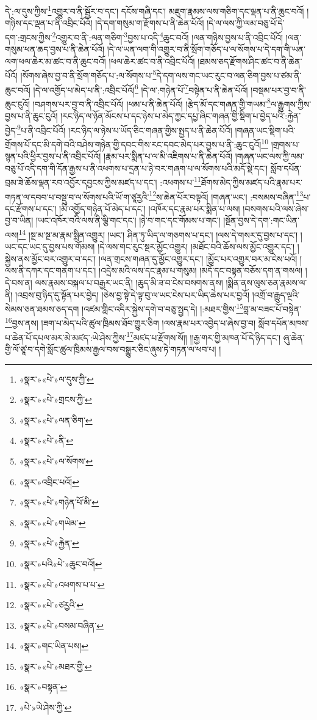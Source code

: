 དེ་:ལ་དུས་ཀྱིས་\footnote{«སྣར་»«པེ་»ལ་དུས་ཀྱི་}འགྱུར་བ་ནི་སྦྱོར་བ་དང་། དངོས་གཞི་དང་། མཇུག་རྣམས་ལས་གཅིག་དང་ལྡན་པ་ནི་ཆུང་བའོ། །གཉིས་དང་ལྡན་པ་ནི་འབྲིང་པོའོ། །དེ་དག་གསུམ་ག་རྫོགས་པ་ནི་ཆེན་པོའོ། །དེ་ལ་ལས་ཀྱི་ལམ་བཅུ་པོ་དེ་དག་:གྲངས་ཀྱིས་\footnote{«སྣར་»«པེ་»གྲངས་ཀྱི་}འགྱུར་བ་ནི་:ལན་གཅིག་\footnote{«སྣར་»«པེ་»ལན་ཅིག་}བྱས་པ་འདི་\footnote{«སྣར་»«པེ་»ནི་}ཆུང་བའོ། །ལན་གཉིས་བྱས་པ་ནི་འབྲིང་པོའོ། །ལན་གསུམ་ཕན་ཆད་བྱས་པ་ནི་ཆེན་པོའོ། །དེ་ལ་ཡན་ལག་གི་འགྱུར་བ་ནི་སྲོག་གཅོད་པ་ལ་སོགས་པ་དེ་དག་གི་ཡན་ལག་ཕལ་ཆེར་མ་ཚང་བ་ནི་ཆུང་བའོ། །ཕལ་ཆེར་ཚང་བ་ནི་འབྲིང་པོའོ། །ཐམས་ཅད་རྫོགས་ཤིང་ཚང་བ་ནི་ཆེན་པོའོ། །སོགས་ཞེས་བྱ་བ་ནི་སྲོག་གཅོད་པ་:ལ་སོགས་པ་\footnote{«སྣར་»«པེ་»ལ་སོགས་}དེ་དག་ལས་གང་ཡང་རུང་བ་ལན་ཅིག་བྱས་པ་ཙམ་ནི་ཆུང་བའོ། །དེ་ལ་འགྱོད་པ་མེད་པ་ནི་:འབྲིང་པོའོ།\footnote{«སྣར་»འབྲིང་པའོ།} །དེ་ལ་:གཉེན་པོ་\footnote{«སྣར་»«པེ་»གཉེན་པོ་མི་}བསྟེན་པ་ནི་ཆེན་པོའོ། །བསྡམ་པར་བྱ་བ་ནི་ཆུང་ངུའོ། །བཤགས་པར་བྱ་བ་ནི་འབྲིང་པོའོ། །ཕམ་པ་ནི་ཆེན་པོའོ། །རྩེད་མོ་དང་གཞན་གྱི་གཡམ་\footnote{«སྣར་»«པེ་»གཡེམ་}ལ་རྒྱུགས་ཀྱིས་བྱས་པ་ནི་ཆུང་ངུའོ། །རང་ཉིད་ལ་ཉོན་མོངས་པ་དང་ཉེས་པ་མེད་ཀྱང་དཔྱ་ཞིང་གཞན་གྱི་སྡིག་པ་བྱེད་པའི་:རྐྱེན་བྱེད་\footnote{«སྣར་»«པེ་»རྐྱེན་}པ་ནི་འབྲིང་པོའོ། །རང་ཉིད་ལ་ཉེས་པ་ཡོད་ཅིང་གཞན་གྱིས་སྤྱད་པ་ནི་ཆེན་པོའོ། །གཞན་ཡང་སྡིག་པའི་གྲོགས་པོ་དང་མི་དགེ་བའི་བཤེས་གཉེན་གྱི་དབང་གིས་རང་དབང་མེད་པར་བྱས་པ་ནི་:ཆུང་ངུའོ།\footnote{«སྣར་»པའི«པེ་»ཆུང་བའོ།} །གྲགས་པ་སྙན་པའི་ཕྱིར་བྱས་པ་ནི་འབྲིང་པོའོ། །རྣམ་པར་སྨིན་པ་ལ་མི་འཇིགས་པ་ནི་ཆེན་པོའོ། །གཞན་ཡང་ལས་ཀྱི་ལམ་བཅུ་པོ་འདི་དག་གི་དོན་རྒྱས་པ་ནི་འཕགས་པ་དྲན་པ་ཉེ་བར་གཞག་པ་ལ་སོགས་པའི་མདོ་སྡེ་དང་། སློབ་དཔོན་བྲམ་ཟེ་ཆོས་ལྡན་རབ་འབྱོར་དབྱངས་ཀྱིས་མཛད་པ་དང་། :འཕགས་པ་\footnote{«སྣར་»«པེ་»འཕགས་པ་པ་}ཐོགས་མེད་ཀྱིས་མཛད་པའི་རྣམ་པར་གཏན་ལ་དབབ་པ་བསྡུ་བ་ལ་སོགས་པའི་ཡོ་ག་ཙཱརྱའི་\footnote{«སྣར་»«པེ་»ཙརྱའི་}ས་ཆེན་པོར་བལྟའོ། །གཞན་ཡང་། :བསམས་བཞིན་\footnote{«སྣར་»«པེ་»བསམ་བཞིན་}པ་དང་རྫོགས་པ་དང་། །མི་འགྱོད་གཉེན་པོ་མེད་པ་དང་། །འཁོར་དང་རྣམ་པར་སྨིན་པ་ལས། །བསགས་པའི་ལས་ཞེས་བྱ་བ་ཡིན། །ཡང་འཁོར་བའི་ལས་ནི་ལྕི་གང་དང་། །ཉེ་བ་གང་དང་གོམས་པ་གང་། །སྔོན་བྱས་དེ་དག་:གང་ཡིན་ལས།\footnote{«སྣར་»གང་ཡིན་པས།} །སྔ་མ་སྔ་མ་རྣམ་སྨིན་འགྱུར། །ཡང་། ཤིན་ཏུ་ཡིད་ལ་གཅགས་པ་དང་། །ལས་དེ་གསར་དུ་བྱས་པ་དང་། །ཡང་དང་ཡང་དུ་བྱས་པས་གོམས། །དེ་ལས་གང་རུང་སྔར་མྱོང་འགྱུར། །མཐོང་བའི་ཆོས་ལས་མྱོང་འགྱུར་དང་། །སྐྱེས་ནས་མྱོང་བར་འགྱུར་བ་དང་། །ལན་གྲངས་གཞན་དུ་མྱོང་འགྱུར་དང་། །མྱོང་པར་འགྱུར་བར་མ་ངེས་པའོ། །ལས་ནི་དཀར་དང་གནག་པ་དང་། །འདྲེས་མའི་ལས་དང་རྣམ་པ་གསུམ། །མདོ་དང་བསྟན་བཅོས་དག་ན་གསལ། །དེ་བས་ན། ལས་རྣམས་བསྐལ་པ་བརྒྱར་ཡང་ནི། །ཆུད་མི་ཟ་བ་ངེས་བསགས་ནས། །སྨིན་ནས་ལུས་ཅན་རྣམས་ལ་ནི། །འབྲས་བུ་ཉིད་དུ་སྟོན་པར་བྱེད། །ཅེས་བྱ་སྟེ་དེ་ལྟ་བུ་ལ་ཡང་ངེས་པར་ཡིད་ཆེས་པར་བྱའོ། །འགྲོ་བ་རྒྱུད་ལྔའི་སེམས་ཅན་ཐམས་ཅད་དག །འཛམ་གླིང་འདིར་སྐྱེས་དགེ་བ་བཅུ་སྤྱད་དེ། །:མཐར་གྱིས་\footnote{«སྣར་»«པེ་»མཐར་གྱི་}བླ་མ་བཟང་པོ་བསྟེན་\footnote{«སྣར་»བསྟན་}བྱས་ནས། །ཟག་པ་མེད་པའི་ཚུལ་ཁྲིམས་ཐོབ་གྱུར་ཅིག །ལས་རྣམ་པར་འབྱེད་པ་ཞེས་བྱ་བ། སློབ་དཔོན་མཁས་པ་ཆེན་པོ་དཔལ་མར་མེ་མཛད་:ཡེ་ཤེས་ཀྱིས་\footnote{«པེ་»ཡེ་ཤེས་ཀྱི་}མཛད་པ་རྫོགས་སོ།། །།རྒྱ་གར་གྱི་མཁན་པོ་དེ་ཉིད་དང་། ཞུ་ཆེན་གྱི་ལོ་ཙཱ་བ་དགེ་སློང་ཚུལ་ཁྲིམས་རྒྱལ་བས་བསྒྱུར་ཅིང་ཞུས་ཏེ་གཏན་ལ་ཕབ་པ། ། 